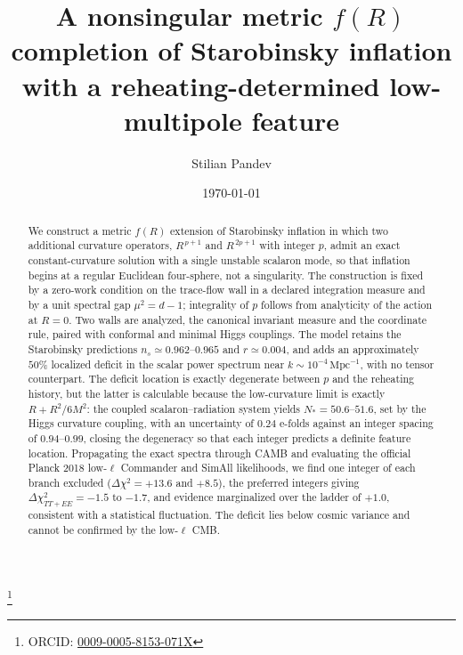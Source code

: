\documentclass[aps,prd,twocolumn,superscriptaddress,nofootinbib,longbibliography]{revtex4-2}
\begin{document}
\title{A nonsingular metric $f(R)$ completion of Starobinsky inflation
with a reheating-determined low-multipole feature}

\author{Stilian Pandev}
\thanks{ORCID: \href{https://orcid.org/0009-0005-8153-071X}{0009-0005-8153-071X}}

\date{\today}

\begin{abstract}
We construct a metric $f(R)$ extension of Starobinsky inflation in which two
additional curvature operators, $R^{\,p+1}$ and $R^{\,2p+1}$ with integer
$p$, admit an exact constant-curvature solution with a single unstable
scalaron mode, so that inflation begins at a regular Euclidean four-sphere,
not a singularity. The construction is fixed by a zero-work
condition on the trace-flow wall in a declared integration measure and by a
unit spectral gap $\mu^2=d-1$; integrality of $p$ follows from analyticity
of the action at $R=0$. Two walls are analyzed, the canonical invariant
measure and the coordinate rule, paired with conformal and minimal Higgs
couplings. The
model retains the Starobinsky predictions $n_s\simeq0.962$--$0.965$ and
$r\simeq0.004$, and adds an approximately $50\%$ localized deficit in the
scalar power spectrum near $k\sim10^{-4}\,\mathrm{Mpc}^{-1}$, with no tensor
counterpart. The deficit location is exactly degenerate between $p$ and the
reheating history, but the latter is calculable because the low-curvature
limit is exactly $R+R^2/6M^2$: the coupled scalaron--radiation system yields
$N_*=50.6$--$51.6$, set by the Higgs curvature coupling, with an uncertainty
of $0.24$ e-folds against an integer spacing of $0.94$--$0.99$, closing the
degeneracy so that each integer predicts a definite feature location.
Propagating the exact spectra through CAMB and evaluating the official
Planck 2018 low-$\ell$ Commander and SimAll likelihoods, we find one
integer of each branch excluded
($\Delta\chi^2=+13.6$ and $+8.5$), the preferred integers giving
$\Delta\chi^2_{TT+EE}=-1.5$ to $-1.7$, and evidence marginalized over the
ladder of $+1.0$, consistent with a statistical fluctuation. The deficit lies
below cosmic variance and cannot be confirmed by the low-$\ell$ CMB.
\end{abstract}

\maketitle
\end{document}
